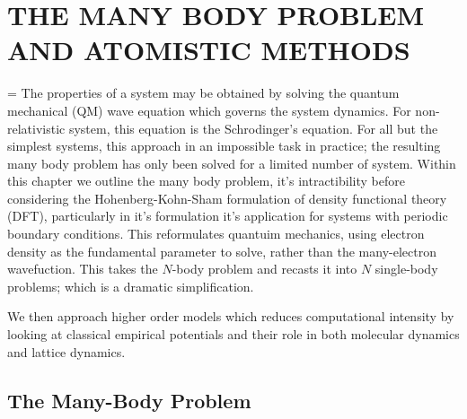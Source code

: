 \chapter{THE MANY BODY PROBLEM AND ATOMISTIC METHODS}
\hfuzz=20pt
\vfuzz=20pt
\vbadness=\maxdimen
The properties of a system may be obtained by solving the quantum mechanical (QM) wave equation which governs the system dynamics.  For non-relativistic system, this equation is the Schrodinger's equation.  For all but the simplest systems, this approach in an impossible task in practice; the resulting many body problem has only been solved for a limited number of system.  Within this chapter we outline the many body problem, it's intractibility before considering the Hohenberg-Kohn-Sham formulation of density functional theory (DFT), particularly in it's formulation it's application for systems with periodic boundary conditions.  This reformulates quantuim mechanics, using electron density as the fundamental parameter to solve, rather than the many-electron wavefuction.  This takes the $N$-body problem and recasts it into $N$ single-body problems; which is a dramatic simplification.

We then approach higher order models which reduces computational intensity by looking at classical empirical potentials and their role in both molecular dynamics and lattice dynamics.

\section{The Many-Body Problem}

